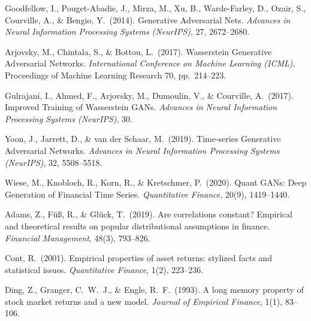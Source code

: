 \documentclass[10pt]{article}
\begin{document}
{\small
\begin{enumerate}[label={\textbf{[\arabic*]}},leftmargin=2.8em,itemsep=5pt,parsep=0pt,topsep=2pt]

\item \hypertarget{R:1}{}%
  Goodfellow, I., Pouget-Abadie, J., Mirza, M., Xu, B., Warde-Farley, D., Ozair, S., Courville, A., \& Bengio, Y.\ (2014).
  Generative Adversarial Nets.
  \textit{Advances in Neural Information Processing Systems (NeurIPS)}, 27, 2672--2680.

\item \hypertarget{R:2}{}%
  Arjovsky, M., Chintala, S., \& Bottou, L.\ (2017).
  Wasserstein Generative Adversarial Networks.
  \textit{International Conference on Machine Learning (ICML)},
  Proceedings of Machine Learning Research 70, pp.\ 214--223.

\item \hypertarget{R:3}{}%
  Gulrajani, I., Ahmed, F., Arjovsky, M., Dumoulin, V., \& Courville, A.\ (2017).
  Improved Training of Wasserstein GANs.
  \textit{Advances in Neural Information Processing Systems (NeurIPS)}, 30.

\item \hypertarget{R:4}{}%
  Yoon, J., Jarrett, D., \& van der Schaar, M.\ (2019).
  Time-series Generative Adversarial Networks.
  \textit{Advances in Neural Information Processing Systems (NeurIPS)}, 32, 5508--5518.

\item \hypertarget{R:5}{}%
  Wiese, M., Knobloch, R., Korn, R., \& Kretschmer, P.\ (2020).
  Quant GANs: Deep Generation of Financial Time Series.
  \textit{Quantitative Finance}, 20(9), 1419--1440.

\item \hypertarget{R:6}{}%
  Adams, Z., F\"u{\ss}, R., \& Gl\"uck, T.\ (2019).
  Are correlations constant? Empirical and theoretical results on popular distributional
  assumptions in finance.
  \textit{Financial Management}, 48(3), 793--826.

\item \hypertarget{R:7}{}%
  Cont, R.\ (2001).
  Empirical properties of asset returns: stylized facts and statistical issues.
  \textit{Quantitative Finance}, 1(2), 223--236.

\item \hypertarget{R:8}{}%
  Ding, Z., Granger, C.\ W.\ J., \& Engle, R.\ F.\ (1993).
  A long memory property of stock market returns and a new model.
  \textit{Journal of Empirical Finance}, 1(1), 83--106.


\end{enumerate}}
\end{document}
